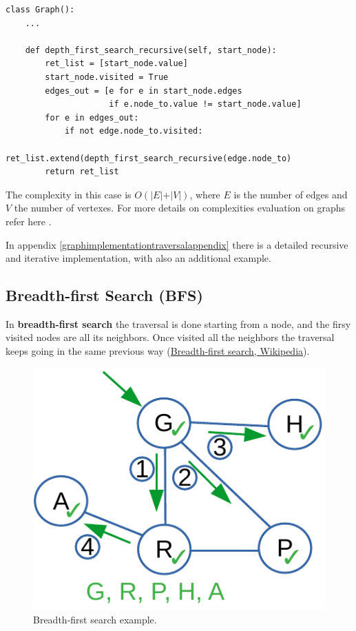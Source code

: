 \begin{lstlisting}[firstnumber=1, caption={Recursive implementation of a depth-first search.}]
class Graph():
	...
	
	def depth_first_search_recursive(self, start_node):
		ret_list = [start_node.value]
		start_node.visited = True
		edges_out = [e for e in start_node.edges
					 if e.node_to.value != start_node.value]
		for e in edges_out:
			if not edge.node_to.visited:
				ret_list.extend(depth_first_search_recursive(edge.node_to)
		return ret_list
\end{lstlisting}

The complexity in this case is \(O(\vert E \vert + \vert V \vert)\), where \(E\) is the number of edges and \(V\) the number of vertexes. For more details on complexities evaluation on graphs refer here \cite{goodrich2013data}.

In appendix \ref{graphimplementationtraversalappendix} there is a detailed recursive and iterative implementation, with also an additional example.
\subsection{Breadth-first Search (BFS)}
In \textbf{breadth-first search} the traversal is done starting from a node, and the firsy visited nodes are all its neighbors. Once visited all the neighbors the traversal keeps going in the same previous way \cite{wikibreadthfirst} (\href{https://en.wikipedia.org/wiki/Breadth-first_search}{Breadth-first search, Wikipedia}).

\begin{figure}[H]
	\begin{center}
		\includegraphics[scale=.6]{chapters/graphs/images/graphs_7.pdf}
		\caption[Breadth-first search example.]{Breadth-first search example.}
		\label{graphs_7}
	\end{center}
\end{figure}

